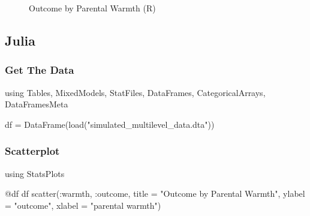 \documentclass[
  letterpaper,
  DIV=11,
  numbers=noendperiod]{scrreprt}
\newenvironment{Shaded}{\begin{snugshade}}{\end{snugshade}}
\newcommand{\BuiltInTok}[1]{\textcolor[rgb]{0.00,0.23,0.31}{#1}}
\newcommand{\FunctionTok}[1]{\textcolor[rgb]{0.28,0.35,0.67}{#1}}
\newcommand{\ImportTok}[1]{\textcolor[rgb]{0.00,0.46,0.62}{#1}}
\newcommand{\NormalTok}[1]{\textcolor[rgb]{0.00,0.23,0.31}{#1}}
\newcommand{\OperatorTok}[1]{\textcolor[rgb]{0.37,0.37,0.37}{#1}}
\newcommand{\PreprocessorTok}[1]{\textcolor[rgb]{0.68,0.00,0.00}{#1}}
\newcommand{\StringTok}[1]{\textcolor[rgb]{0.13,0.47,0.30}{#1}}
\begin{document}
\begin{figure}[H]


\caption{\label{fig-R}Outcome by Parental Warmth (R)}

\end{figure}%

\subsection{Julia}

\subsubsection{Get The Data}\label{get-the-data-2}

\begin{Shaded}
\begin{Highlighting}[]
\ImportTok{using} \BuiltInTok{Tables}\NormalTok{, }\BuiltInTok{MixedModels}\NormalTok{, }\BuiltInTok{StatFiles}\NormalTok{, }\BuiltInTok{DataFrames}\NormalTok{, }\BuiltInTok{CategoricalArrays}\NormalTok{, }\BuiltInTok{DataFramesMeta}

\NormalTok{df }\OperatorTok{=} \FunctionTok{DataFrame}\NormalTok{(}\FunctionTok{load}\NormalTok{(}\StringTok{"simulated\_multilevel\_data.dta"}\NormalTok{))}
\end{Highlighting}
\end{Shaded}

\subsubsection{Scatterplot}\label{scatterplot-2}

\begin{Shaded}
\begin{Highlighting}[]
\ImportTok{using} \BuiltInTok{StatsPlots}

\PreprocessorTok{@df}\NormalTok{ df }\FunctionTok{scatter}\NormalTok{(}\OperatorTok{:}\NormalTok{warmth, }\OperatorTok{:}\NormalTok{outcome, }
\NormalTok{               title }\OperatorTok{=} \StringTok{"Outcome by Parental Warmth"}\NormalTok{,}
\NormalTok{               ylabel }\OperatorTok{=} \StringTok{"outcome"}\NormalTok{,}
\NormalTok{               xlabel }\OperatorTok{=} \StringTok{"parental warmth"}\NormalTok{)}
\end{Highlighting}
\end{Shaded}
\end{document}
